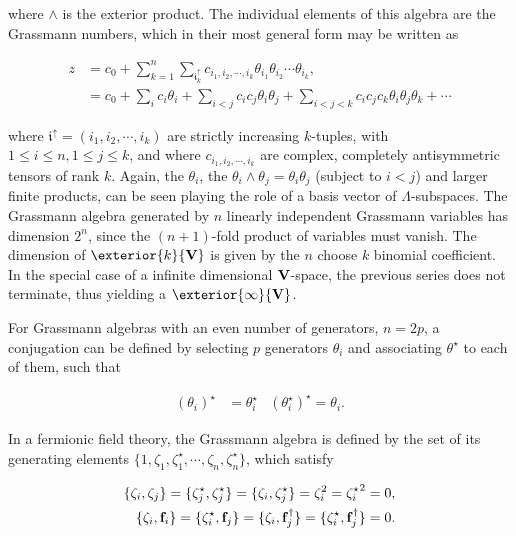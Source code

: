 where $\land$ is the exterior product. The individual elements of this algebra are the Grassmann numbers, which in their most general form may be written as 

\begin{equation}
    \begin{split}
    z &= c_0 + \sum_{k=1}^{n} \sum_{\mathfrak{i}^{\uparrow}_k} c_{i_1, i_2, \cdots, i_k} \theta_{i_1} \theta_{i_2} \cdots  \theta_{i_k}, \\
    &= c_0 + \sum_{i} c_i \theta_i + \sum_{i < j} c_i c_j \theta_i \theta_{j} + \sum_{i<j<k}c_i c_j c_k \theta_i \theta_{j} \theta_k + \cdots
    \end{split}
\end{equation} 

where $\mathfrak{i}^{\uparrow} = (i_1, i_2, \cdots, i_k)$ are strictly increasing $k$-tuples, with $1 \leq i \leq n, 1 \leq j \leq k$, and where $ c_{i_1, i_2, \cdots, i_k}$ are complex, completely antisymmetric tensors of rank $k$. Again, the $\theta_i$, the $\theta_i \land \theta_j = \theta_i \theta_j$ (subject to $i<j$) and larger finite products, can be seen playing the role of a basis vector of $\Lambda$-subspaces. The Grassmann algebra generated by $n$ linearly independent Grassmann variables has dimension $2^n$, since the $(n+1)$-fold product of variables must vanish. The dimension of $\exterior{k} {\bf V}$ is given by the $n$ choose $k$ binomial coefficient. In the special case of a infinite dimensional ${\bf V}$-space, the previous series does not terminate, thus yielding a $\exterior{\infty} {\bf V}$. 

For Grassmann algebras with an even number of generators, $n = 2p$, a conjugation can be defined by selecting $p$ generators $\theta_i$ and associating $\theta^\star$ to each of them, such that

\begin{align*}
    (\theta_i)^\star &= \theta_i^\star & (\theta_i^\star)^\star = \theta_i.
\end{align*}

In a fermionic field theory, the Grassmann algebra is defined by the set of its generating elements $\{1, \zeta_1, {\zeta}^\star_1, \cdots, \zeta_n, {\zeta}^\star_n\}$, which satisfy 

\begin{equation}
\begin{split}
    \{\zeta_i, \zeta_j\} = 
    \{{\zeta}^\star_j, {\zeta}^\star_j\} = \{{\zeta}_i, {\zeta}^\star_j \} = {\zeta}_i^2 = {{\zeta}^\star_i}^2 = 0, \\
    \{\zeta_i, {\bf f}_i\} = \{{\zeta}^\star_i, {\bf f}_j\} = \{\zeta_i, {\bf f}_j^\dagger\} = \{{\zeta}^\star_i, {\bf f}_j^\dagger\} = 0.
\end{split}
\end{equation}

